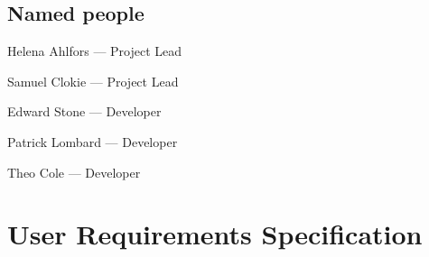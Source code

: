 \documentclass[a4paper, 10pt]{article}
\begin{document}
\subsection{Named people}
\begin{description}[align=right,labelwidth=2cm]
    \setlength\itemsep{-0.3em}
    \item [HA]  Helena Ahlfors --- Project Lead
    \item [SC]  Samuel Clokie --- Project Lead
    \item [ES]  Edward Stone --- Developer
    \item [PL]  Patrick Lombard --- Developer
    \item [TC]  Theo Cole --- Developer
\end{description}




\section{User Requirements Specification}
\end{document}
